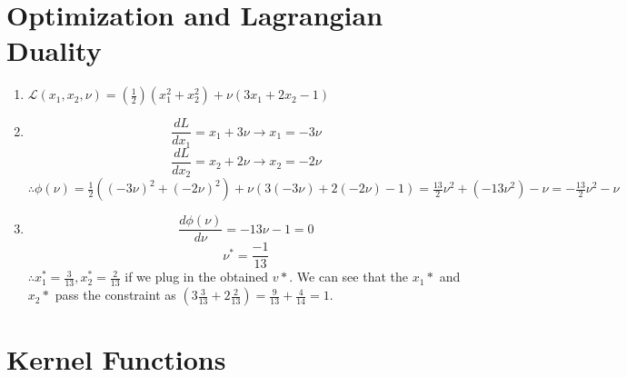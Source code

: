 \documentclass[english]{article}
\begin{document}
\section{Optimization and Lagrangian Duality}
\label{sec:optimization}

\begin{enumerate}
	\item 
	${\mathcal{L}}(x_1,x_2,\nu) = (\frac{1}{2})(x_1^2 + x_2^2) + \nu(3x_1 + 2x_2 - 1)$
	\item 
	$$\frac{dL}{dx_1} = x_1 + 3\nu \rightarrow x_1 = -3\nu$$
	$$\frac{dL}{dx_2} = x_2 + 2\nu \rightarrow x_2 = -2\nu$$
	$\therefore \phi(\nu) = \frac{1}{2}((-3\nu)^2 + (-2\nu)^2) + \nu(3(-3\nu) + 2(-2\nu) -1) = \frac{13}{2}\nu^2 + (-13\nu^2) -\nu =  -\frac{13}{2}\nu^2 -\nu$
	\item 
	$$\frac{d\phi(\nu)}{d\nu} =  -13\nu -1 = 0$$
	$$\nu^*= \frac{-1}{13}$$
	$\therefore x_1^* = \frac{3}{13},  x_2^* = \frac{2}{13}$ if we plug in the obtained $v*$. We can see that the $x_1*$ and $x_2*$ pass the constraint as $(3\frac{3}{13} + 2\frac{2}{13}) = \frac{9}{13} + \frac{4}{14} = 1$.
\end{enumerate}


\section{Kernel Functions}
\end{document}
